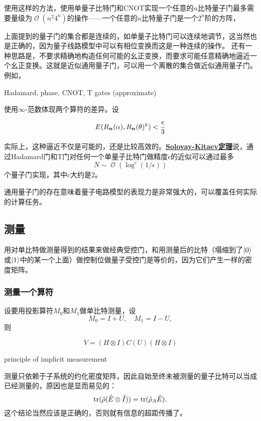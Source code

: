 \documentclass[hyperref, UTF8, a4paper]{ctexart}
\DeclareMathOperator{\bigO}{\mathcal{O}}
\newcommand*{\concept}[1]{\underline{\textbf{#1}}}
\begin{document}
使用这样的方法，使用单量子比特门和CNOT实现一个任意的$n$比特量子门最多需要量级为$\bigO(n^2 4^n)$的操作——一个任意的$n$比特量子门是一个$2^n$阶的方阵，

上面提到的量子门的集合都是连续的，如单量子比特门可以连续地调节，这当然也是正确的，因为量子线路模型中可以有相位变换而这是一种连续的操作。
还有一种思路是，不要求精确地构造任何可能的幺正变换，而要求可能任意精确地逼近一个幺正变换。这就是近似通用量子门，可以用一个离散的集合做近似通用量子门。例如，

Hadamard, phase, CNOT, T gates (approximate)

使用$\infty$-范数体现两个算符的差异。设

\begin{equation}
    E(R_{\vb*{n}}(\alpha), R_{\vb*{n}}(\theta)^k) < \frac{\epsilon}{3}
\end{equation}

实际上，这种逼近不仅是可能的，还是比较高效的。\concept{Solovay-Kitaev定理}说，通过Hadamard门和T门对任何一个单量子比特门做精度$\epsilon$的近似可以通过最多
\begin{equation}
    N \sim \bigO(\log^c(1/\epsilon))
\end{equation}
个量子门实现，其中$c$大约是$2$。

通用量子门的存在意味着量子电路模型的表现力是非常强大的，可以覆盖任何实际的计算任务。

\subsection{测量}\label{sec:measurement}

用对单比特做测量得到的结果来做经典受控门，和用测量后的比特（塌缩到了$\ket{0}$或$\ket{1}$中的某一个上面）做控制位做量子受控门是等价的，因为它们产生一样的密度矩阵。

\subsubsection{测量一个算符}

设要用投影算符$M_0$和$M_1$做单比特测量，设
\begin{equation}
    M_0 = I + U, \quad M_1 = I - U,
\end{equation}
则

\begin{equation}
    V = (H \otimes I) C(U) (H \otimes I)
\end{equation}

principle of implicit measurement

测量只依赖于子系统的约化密度矩阵，因此自始至终未被测量的量子比特可以当成已经测量的，原因也是显而易见的：
\begin{equation}
    \trace (\hat{\rho}(\hat{E} \otimes \hat{I})) = \trace (\hat{\rho}_A \hat{E}).
\end{equation}
这个结论当然应该是正确的，否则就有信息的超距传播了。
\end{document}
